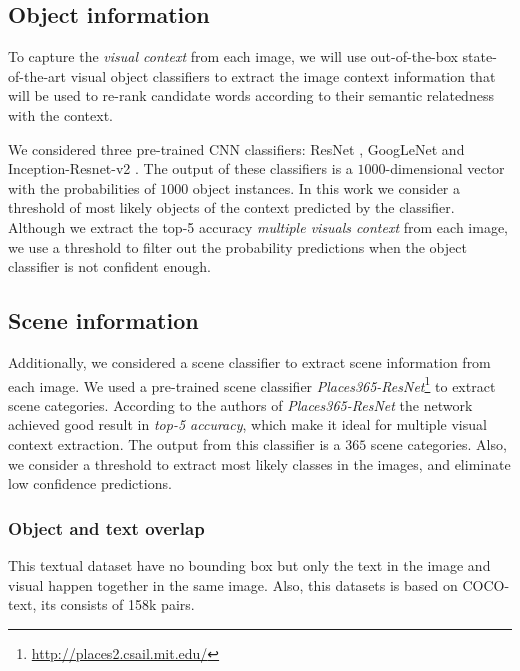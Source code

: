 \documentclass[phd,tocprelim]{cornell}
\begin{document}
\subsection{Object information}
To capture the \textit{visual context} from each image, we will use out-of-the-box state-of-the-art visual object classifiers to extract the image context information that will be used to re-rank candidate words according to their semantic relatedness with the context.

We considered three pre-trained CNN classifiers: ResNet \cite{he2016deep}, GoogLeNet \cite{szegedy2015going} and Inception-Resnet-v2 \cite{szegedy2017inception}. The output of these classifiers is a $1000$-dimensional vector with the probabilities of $1000$ object instances. In this work we consider a threshold of most likely objects of the context predicted by the classifier. Although we extract the top-5 accuracy \textit{multiple visuals context} from each image, we use a threshold to filter out the probability predictions when the object classifier is not confident enough.
\subsection{Scene information}
Additionally, we considered a scene classifier \cite{zhou2017places} to extract scene information from each image. We used a pre-trained scene classifier {\textit{Places365-ResNet}}\footnote{\href{http://places2.csail.mit.edu/}{http://places2.csail.mit.edu/}} to extract scene categories. According to the authors of \textit{Places365-ResNet} the network achieved good result in \textit{top-5 accuracy}, which make it ideal for multiple visual context extraction. The output from this classifier is a $365$ scene categories. Also, we consider a threshold to extract most likely classes in the images, and eliminate low confidence predictions.  

\subsubsection{Object and text overlap}
This textual dataset have no bounding box but only the text in the image and visual happen together in the same image.  Also, this datasets is based on COCO-text, its consists of 158k pairs.
\end{document}
